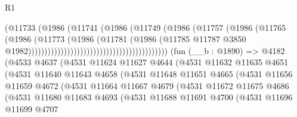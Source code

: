 \begin{lexlean}{R1}
\begin{coremodule}
                                                            (@11733
                                                              (@1986
                                                                (@11741
                                                                  (@1986
                                                                    (@11749
                                                                      (@1986
                                                                        (@11757
                                                                          (@1986
                                                                            (@11765
                                                                              (@1986
                                                                                (@11773
                                                                                  (@1986
                                                                                    (@11781
                                                                                      (@1986
                                                                                        (@11785
                                                                                          @11787
                                                                                          @3850
                                                                                          @1982)))))))))))))))))))))))))))))))))))))))))))
    (fun (__b : @1890) =>
    @4182
      (@4533
        @4637
        (@4531
          @11624
          @11627
          @4644
          (@4531
            @11632
            @11635
            @4651
            (@4531
              @11640
              @11643
              @4658
              (@4531
                @11648
                @11651
                @4665
                (@4531
                  @11656
                  @11659
                  @4672
                  (@4531
                    @11664
                    @11667
                    @4679
                    (@4531
                      @11672
                      @11675
                      @4686
                      (@4531
                        @11680
                        @11683
                        @4693
                        (@4531
                          @11688
                          @11691
                          @4700
                          (@4531
                            @11696
                            @11699
                            @4707

\end{coremodule}
\end{lexlean}
